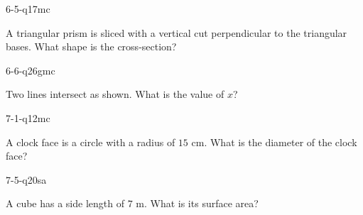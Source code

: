 \begin{practiceQuestion}{6-5-q17}{mc}
\begin{questionText}
A triangular prism is sliced with a vertical cut perpendicular to the triangular bases. What shape is the cross-section?
\end{questionText}
\end{practiceQuestion}

\begin{practiceQuestion}{6-6-q26}{gmc}
\begin{questionText}
Two lines intersect as shown. What is the value of $x$?

\begin{center}
\end{center}
\end{questionText}
\end{practiceQuestion}

\begin{practiceQuestion}{7-1-q12}{mc}
\begin{questionText}
A clock face is a circle with a radius of $15$ cm. What is the diameter of the clock face?
\end{questionText}
\end{practiceQuestion}

\begin{practiceQuestion}{7-5-q20}{sa}
\begin{questionText}
A cube has a side length of $7$ m. What is its surface area?
\end{questionText}
\end{practiceQuestion}

